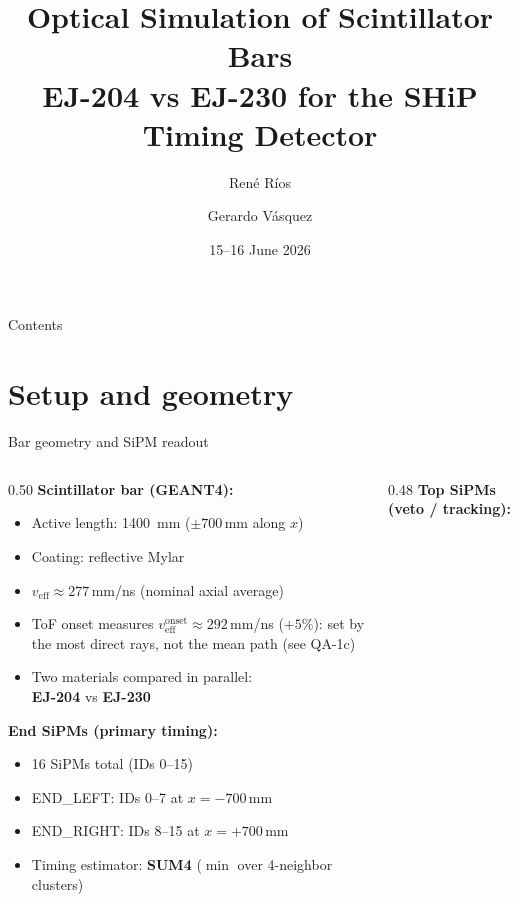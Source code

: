 \documentclass[aspectratio=169,9pt]{beamer}
\title[EJ-204 vs EJ-230 — SHiP Timing]{%
  Optical Simulation of Scintillator Bars\\
  \large EJ-204 vs EJ-230 for the SHiP Timing Detector}
\author[R.~Ríos / G.~Vásquez]{%
  René Ríos \and Gerardo Vásquez}
\institute[SHiP Timing]{SHiP Collaboration — Timing Detector Group}
\date{15--16 June 2026}
\begin{document}
\begin{frame}[plain]
  \titlepage
\end{frame}

\begin{frame}{Contents}
  \tableofcontents
\end{frame}

\section{Setup and geometry}

\begin{frame}{Bar geometry and SiPM readout}
  \begin{columns}[T]
    \begin{column}{0.50\textwidth}
      \textbf{Scintillator bar (GEANT4):}
      \begin{itemize}
        \item Active length: \SI{1400}{\mm} ($\pm700$\,mm along $x$)
        \item Coating: reflective Mylar
        \item $v_\text{eff}\approx277$\,mm/ns (nominal axial average)
        \item[$\hookrightarrow$] {\footnotesize ToF onset measures $v_\text{eff}^\text{onset}\approx292$\,mm/ns
              ($+5\%$): set by the most direct rays, not the mean path (see QA-1c)}
        \item Two materials compared in parallel:\\
              \textcolor{ej204col}{\textbf{EJ-204}} vs
              \textcolor{ej230col}{\textbf{EJ-230}}
      \end{itemize}
      \vspace{0.2em}
      \textbf{End SiPMs (primary timing):}
      \begin{itemize}
        \item 16 SiPMs total (IDs 0–15)
        \item END\_LEFT: IDs 0–7 at $x=-700$\,mm
        \item END\_RIGHT: IDs 8–15 at $x=+700$\,mm
        \item Timing estimator: \textbf{SUM4} ($\min$ over 4-neighbor clusters)
      \end{itemize}
    \end{column}
    \begin{column}{0.48\textwidth}
      \textbf{Top SiPMs (veto / tracking):}
      \begin{itemize}

\end{itemize}
\end{column}
\end{columns}
\end{frame}
\end{document}
